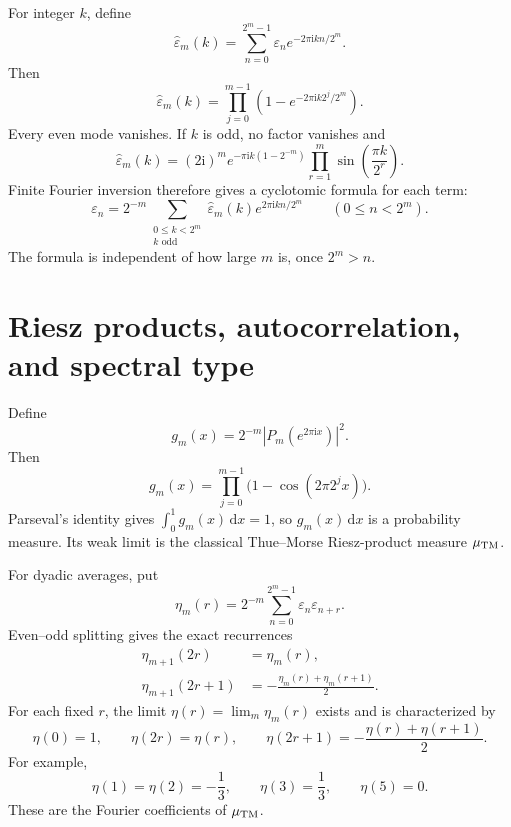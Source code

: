 \documentclass[11pt,oneside]{article}
\numberwithin{equation}{section}
\theoremstyle{definition}
\theoremstyle{remark}
\newcommand{\eps}{\varepsilon}
\newcommand{\ii}{\mathrm i}
\newcommand{\dd}{\,\mathrm d}
\begin{document}
For integer \(k\), define
\begin{equation}
 \widehat\eps_m(k)=\sum_{n=0}^{2^m-1}\eps_n
 e^{-2\pi\ii kn/2^m}.
 \label{eq:DFT-def}
\end{equation}
Then
\begin{equation}
 \boxed{\widehat\eps_m(k)=
 \prod_{j=0}^{m-1}\left(1-e^{-2\pi\ii k2^j/2^m}\right).}
 \label{eq:DFT-product}
\end{equation}
Every even mode vanishes.  If \(k\) is odd, no factor vanishes and
\begin{equation}
 \widehat\eps_m(k)
 =(2\ii)^m e^{-\pi\ii k(1-2^{-m})}
 \prod_{r=1}^{m}\sin\!\left(\frac{\pi k}{2^r}\right).
 \label{eq:DFT-odd}
\end{equation}
Finite Fourier inversion therefore gives a cyclotomic formula for each term:
\begin{equation}
 \boxed{\eps_n=2^{-m}\sum_{\substack{0\le k<2^m\\k\text{ odd}}}
 \widehat\eps_m(k)e^{2\pi\ii kn/2^m}}
 \qquad(0\le n<2^m).
 \label{eq:DFT-inversion}
\end{equation}
The formula is independent of how large \(m\) is, once \(2^m>n\).

\section{Riesz products, autocorrelation, and spectral type}
\label{sec:spectral}

Define
\begin{equation}
 g_m(x)=2^{-m}|P_m(e^{2\pi\ii x})|^2.
 \label{eq:gm}
\end{equation}
Then
\begin{equation}
 \boxed{g_m(x)=\prod_{j=0}^{m-1}
 \bigl(1-\cos(2\pi2^jx)\bigr).}
 \label{eq:Riesz-density}
\end{equation}
Parseval's identity gives \(\int_0^1g_m(x)\dd x=1\), so
\(g_m(x)\dd x\) is a probability measure.  Its weak limit is the classical
Thue--Morse Riesz-product measure \(\mu_{\rm TM}\).

For dyadic averages, put
\begin{equation}
 \eta_m(r)=2^{-m}\sum_{n=0}^{2^m-1}\eps_n\eps_{n+r}.
 \label{eq:finite-correlation}
\end{equation}
Even--odd splitting gives the exact recurrences
\begin{align}
 \eta_{m+1}(2r)&=\eta_m(r),
 \label{eq:eta-finite-even}\\
 \eta_{m+1}(2r+1)&=-\frac{\eta_m(r)+\eta_m(r+1)}2.
 \label{eq:eta-finite-odd}
\end{align}
For each fixed \(r\), the limit \(\eta(r)=\lim_m\eta_m(r)\) exists and is
characterized by
\begin{equation}
 \boxed{\eta(0)=1,\qquad
 \eta(2r)=\eta(r),\qquad
 \eta(2r+1)=-\frac{\eta(r)+\eta(r+1)}2.}
 \label{eq:eta-limit}
\end{equation}
For example,
\begin{equation}
 \eta(1)=\eta(2)=-\frac13,\qquad
 \eta(3)=\frac13,\qquad \eta(5)=0.
 \label{eq:eta-examples}
\end{equation}
These are the Fourier coefficients of \(\mu_{\rm TM}\).
\end{document}
